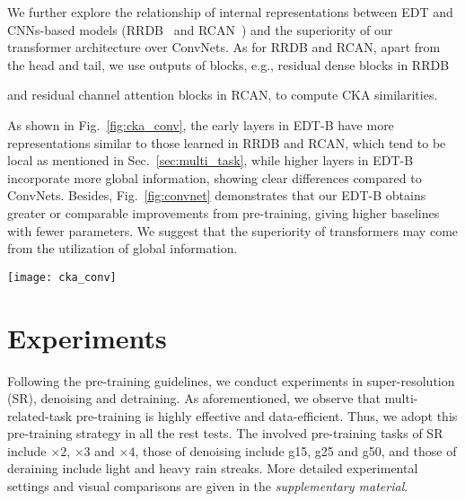 \documentclass[runningheads]{llncs}
\makeatletter
\newcommand*{\eg}{e.g.\@\xspace}
\makeatother
\begin{document}
	We further explore the relationship of internal representations between EDT and CNNs-based models (RRDB~\cite{wang2018esrgan} and RCAN~\cite{zhang2018image}) and the superiority of our transformer architecture over ConvNets. As for RRDB and RCAN, apart from the head and tail, we use outputs of blocks, \eg, residual dense blocks in RRDB
	
	\begin{table}[h]
\begin{minipage}[c]{0.3\linewidth}
			\vspace{-0.1in}
			and residual channel attention blocks in RCAN, to compute CKA similarities.
			
			\setlength{\parindent}{2em}  As shown in Fig.~\ref{fig:cka_conv}, the early layers in EDT-B have more representations similar to those learned in RRDB and RCAN, which tend to be local as mentioned in Sec.~\ref{sec:multi_task}, while higher layers in EDT-B incorporate more global information, showing clear differences compared to ConvNets.  Besides, Fig.~\ref{fig:convnet} demonstrates that our EDT-B obtains greater or comparable improvements from pre-training, giving higher baselines with fewer parameters. We suggest that the superiority of transformers may come from the utilization of global information.
			
			
		\end{minipage}\hfill
		\begin{minipage}[c]{0.65\linewidth}
			\centering
			\texttt{[image: cka\_conv]}
 \label{fig:cka_conv}
		\end{minipage}
		\vspace{-0.1in}
	\end{table}
	
	\noindent  
	
	


	


	\section{Experiments}
	\label{sec:exps}
	Following the pre-training guidelines, we conduct experiments in super-resolution (SR), denoising and detraining. As aforementioned, we observe that multi-related-task pre-training is highly effective and data-efficient. Thus, we adopt this pre-training strategy in all the rest tests. The involved pre-training tasks of SR include $\times 2$, $\times 3$ and $\times 4$, those of denoising include g15, g25 and g50, and those of deraining include light and heavy rain streaks. More detailed experimental settings and visual comparisons are given in the \textit{supplementary material}.  
	
\end{document}
